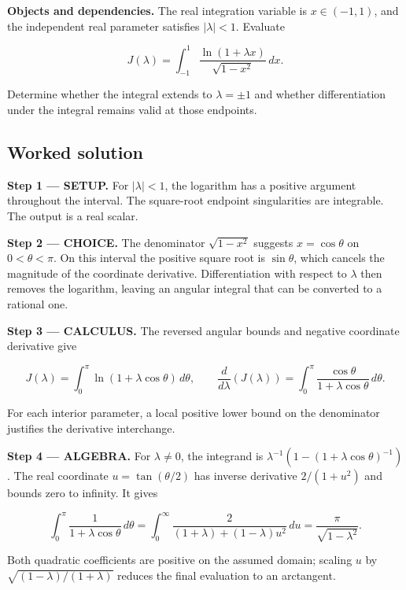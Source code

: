 \documentclass[11pt,oneside,openany]{book}
\begin{document}
\textbf{Objects and dependencies.} The real integration variable is \(x\in(-1,1)\), and the independent real parameter satisfies \(|\lambda|<1\). Evaluate

\[
J(\lambda)=\int_{-1}^1\frac{\ln(1+\lambda x)}{\sqrt{1-x^2}}\,dx.
\]

Determine whether the integral extends to \(\lambda=\pm1\) and whether differentiation under the integral remains valid at those endpoints.
\subsection*{Worked solution}

\textbf{Step 1 --- SETUP.} For \(|\lambda|<1\), the logarithm has a positive argument throughout the interval. The square-root endpoint singularities are integrable. The output is a real scalar.

\begin{ChoiceStep}
\textbf{Step 2 --- CHOICE.} The denominator \(\sqrt{1-x^2}\) suggests \(x=\cos\theta\) on \(0<\theta<\pi\). On this interval the positive square root is \(\sin\theta\), which cancels the magnitude of the coordinate derivative. Differentiation with respect to \(\lambda\) then removes the logarithm, leaving an angular integral that can be converted to a rational one.

\end{ChoiceStep}
\textbf{Step 3 --- CALCULUS.} The reversed angular bounds and negative coordinate derivative give

\[
J(\lambda)=\int_0^\pi\ln(1+\lambda\cos\theta)\,d\theta,
\qquad
\frac{d}{d\lambda}\left(J(\lambda)\right)=\int_0^\pi\frac{\cos\theta}{1+\lambda\cos\theta}\,d\theta.
\]

For each interior parameter, a local positive lower bound on the denominator justifies the derivative interchange.

\begingroup\color{AlgebraBlue}
\textbf{Step 4 --- ALGEBRA.} For \(\lambda\ne0\), the integrand is \(\lambda^{-1}(1-(1+\lambda\cos\theta)^{-1})\). The real coordinate \(u=\tan(\theta/2)\) has inverse derivative \(2/(1+u^2)\) and bounds zero to infinity. It gives

\[
\int_0^\pi\frac{1}{1+\lambda\cos\theta}\,d\theta
=\int_0^\infty\frac{2}{(1+\lambda)+(1-\lambda)u^2}\,du
=\frac\pi{\sqrt{1-\lambda^2}}.
\]

Both quadratic coefficients are positive on the assumed domain; scaling \(u\) by \(\sqrt{(1-\lambda)/(1+\lambda)}\) reduces the final evaluation to an arctangent.
\end{document}
